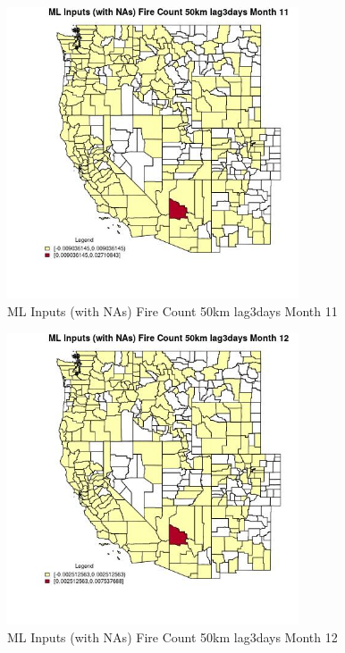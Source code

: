 \begin{figure} 
\centering  
\includegraphics[width=0.77\textwidth]{Code_Outputs/Report_ML_input_PM25_Step4_part_e_de_duplicated_aves_compiled_2019-05-20wNAs_CountyFire_Count_50km_lag3daysmedianMonth11.jpg} 
\caption{\label{fig:Report_ML_input_PM25_Step4_part_e_de_duplicated_aves_compiled_2019-05-20wNAsCountyFire_Count_50km_lag3daysmedianMonth11}ML Inputs (with NAs) Fire Count 50km lag3days Month 11} 
\end{figure} 
 

\begin{figure} 
\centering  
\includegraphics[width=0.77\textwidth]{Code_Outputs/Report_ML_input_PM25_Step4_part_e_de_duplicated_aves_compiled_2019-05-20wNAs_CountyFire_Count_50km_lag3daysmedianMonth12.jpg} 
\caption{\label{fig:Report_ML_input_PM25_Step4_part_e_de_duplicated_aves_compiled_2019-05-20wNAsCountyFire_Count_50km_lag3daysmedianMonth12}ML Inputs (with NAs) Fire Count 50km lag3days Month 12} 
\end{figure} 
 

